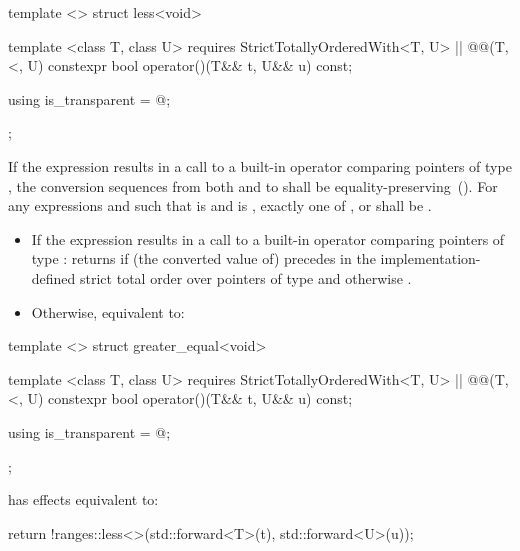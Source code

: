 {%
\begin{itemdecl}
template <> struct less<void> {
  template <class T, class U>
    requires StrictTotallyOrderedWith<T, U> || @\textit{}@(T, <, U)
  constexpr bool operator()(T&& t, U&& u) const;

  using is_transparent = @\unspec@;
};
\end{itemdecl}

\begin{itemdescr}
\pnum
\requires
If the expression  results in a
call to a built-in operator \tcode{<} comparing pointers of type , the
conversion sequences from both  and  to  shall be
equality-preserving~(). For any expressions
 and  such that  is  and
 is , exactly one of ,
 or  shall be
.

\pnum
\effects
\begin{itemize}
\item
If the expression  results in a
call to a built-in operator \tcode{<} comparing pointers of type :
returns  if (the converted value of)  precedes  in
the implementation-defined strict total order over pointers of type 
and otherwise .

\item
Otherwise, equivalent to: 
\end{itemize}
\end{itemdescr}

%
\begin{itemdecl}
template <> struct greater_equal<void> {
  template <class T, class U>
    requires StrictTotallyOrderedWith<T, U> || @\textit{}@(T, <, U)
  constexpr bool operator()(T&& t, U&& u) const;

  using is_transparent = @\unspec@;
};
\end{itemdecl}

\begin{itemdescr}
\pnum
{} has effects equivalent to:
\begin{codeblock}
return !ranges::less<>{}(std::forward<T>(t), std::forward<U>(u));
\end{codeblock}
\end{itemdescr}

}
